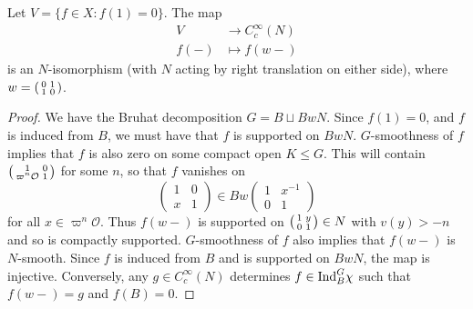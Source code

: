 \begin{lemma}\label{reduce to N}
    Let $V=\{f \in X:f(1)=0\}$. The map 
    \begin{equation*}
        \begin{split}
            V &\to C_c^\infty(N) \\
            f(-) &\mapsto f(w-) 
        \end{split}
    \end{equation*}
    is an $N$-isomorphism (with $N$ acting by right translation on either side), where $w=\begin{psmallmatrix}
        0&1\\1&0
    \end{psmallmatrix}$.
\end{lemma}
\begin{proof}
    We have the Bruhat decomposition $G=B \sqcup BwN$. Since $f(1)=0$, and $f$ is induced from $B$, we must have that $f$ is supported on $BwN$. $G$-smoothness of $f$ implies that $f$ is also zero on some compact open $K \leq G$. This will contain $\begin{psmallmatrix}
        1&0\\\varpi^n \mathcal O &1
    \end{psmallmatrix}$ for some $n$, so that $f$ vanishes on 
    $$\begin{pmatrix}
        1&0\\x&1
    \end{pmatrix} \in Bw \begin{pmatrix}
        1&x^{-1}\\0&1
    \end{pmatrix}$$
    for all $x \in \varpi^n \mathcal O$. Thus $f(w-)$ is supported on $\begin{psmallmatrix}
        1&y\\0&1
    \end{psmallmatrix} \in N$ with $v(y) > -n$ and so is compactly supported. $G$-smoothness of $f$ also implies that $f(w-)$ is $N$-smooth. Since $f$ is induced from $B$ and is supported on $BwN$, the map is injective. Conversely, any $g \in C_c^\infty(N)$ determines $f \in \mathrm{Ind}_B^G \chi$ such that $f(w-)=g$ and $f(B)=0$.
\end{proof}

